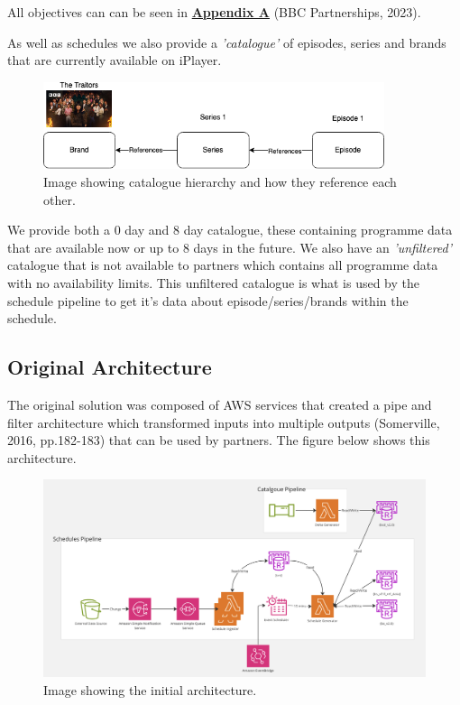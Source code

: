   All objectives can can be seen in \hyperref[sec:AppendixA]{\textbf{Appendix A}} (BBC Partnerships, 2023).

  As well as schedules we also provide a \textit{'catalogue'} of episodes, series and brands that are currently available on iPlayer.

  \begin{figure}[H]
    \centering
    \includegraphics[width=10cm]{assets/catalogueHierarchy.drawio.png}
    \caption{Image showing catalogue hierarchy and how they reference each other.}
    \label{fig:catalogueHierarchy}
  \end{figure}
  
  We provide both a 0 day and 8 day catalogue, these containing programme data that are available now or up to 8 days in the future. We 
  also have an \textit{'unfiltered'} catalogue that is not available to partners which contains all programme data with no availability limits.
  This unfiltered catalogue is what is used by the schedule pipeline to get it's data about episode/series/brands within the schedule.

  \subsection{Original Architecture}
  The original solution was composed of AWS services that created a pipe and filter architecture which transformed inputs into multiple outputs 
  (Somerville, 2016, pp.182-183) that can be used by partners. The figure below shows this architecture.
  
  \begin{figure}[H]
    \centering
    \includegraphics[width=12cm]{assets/architectures/starting.png}
    \caption{Image showing the initial architecture.}
    \label{fig:initialArchitecture}
  \end{figure}

